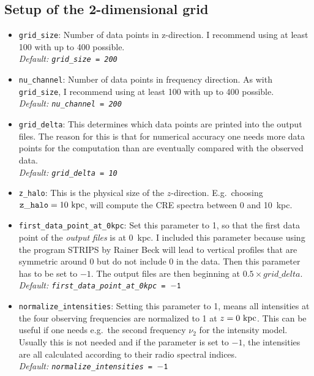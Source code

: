 \documentclass[11pt,twocolumn,a4paper]{article}
\begin{document}
\subsection{Setup of the 2-dimensional grid}
\label{sec:setup_of_the_2D_grid}
\begin{itemize}
\item {\tt grid\_size}:  Number of data points in z-direction. I recommend using at least 100 with up to 400 possible.\\
\emph{Default: {\tt grid\_size = 200}}
\item {\tt nu\_channel}: Number of data points in frequency direction. As with {\tt grid\_size}, I recommend using at least 100 with up to 400 possible.\\
\emph{Default: {\tt nu\_channel = 200}}
\item {\tt grid\_delta}: This determines which data points are printed into the output files. The reason for this is that for numerical accuracy one needs more data points for the computation than are eventually compared with the observed data.\\
\emph{Default: {\tt grid\_delta = 10}}
\item {\tt z\_halo}: This is the physical size of the $z$-direction. E.g.\ choosing ${\tt z\_halo} = 10~\rm kpc$, will compute the CRE spectra between 0 and 10~kpc.
\item {\tt first\_data\_point\_at\_0kpc}: Set this parameter to 1, so that the first data point of the \emph{output files} is at 0~kpc. I included this parameter because using the program {\small STRIPS} by Rainer Beck will lead to vertical profiles that are symmetric around 0 but do not include 0 in the data. Then this parameter has to be set to $-1$. The output files are then beginning at $0.5\times grid\_delta$.\\
\emph{Default: {\tt first\_data\_point\_at\_0kpc = $\tt -1$}}
\item {\tt normalize\_intensities}: Setting this parameter to 1, means all intensities at the four observing frequencies are normalized to 1 at $z=0~\rm kpc$. This can be useful if one needs e.g.\ the second frequency $\nu_2$ for the intensity model. Usually this is not needed and if the parameter is set to $-1$, the intensities are all calculated according to their radio spectral indices.\\
\emph{Default: {\tt normalize\_intensities = $\tt -1$}}
\end{itemize}
\end{document}
